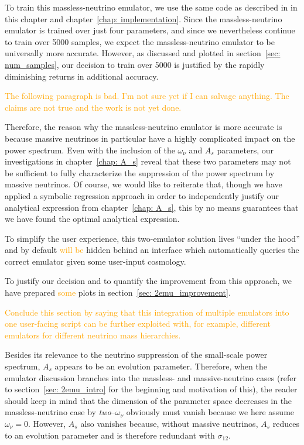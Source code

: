 To train this massless-neutrino emulator, we use the same code as described in 
in this chapter and chapter~\ref{chap: implementation}. Since the
massless-neutrino emulator is trained over just four parameters, and since we 
nevertheless continue to train over 5000 samples, we expect the
massless-neutrino emulator to be universally more accurate. However, as
discussed and plotted in section~\ref{sec: num_samples}, our decision to train 
over 5000 is justified by the rapidly diminishing returns in additional 
accuracy.

\textcolor{orange}{The following paragraph is bad. I'm not sure yet if I can
salvage anything. The claims are not true and the work is not yet done.}

Therefore, the reason why the massless-neutrino emulator is more 
accurate is because massive neutrinos in particular have a highly complicated 
impact on the power spectrum. Even with the inclusion of the $\omega_\nu$ and 
$A_s$ parameters, our investigations in chapter~\ref{chap: A_s} reveal that
these two parameters may not be sufficient to fully characterize the 
suppression of the power spectrum by massive neutrinos. Of course, we would 
like to reiterate that, though we have applied a symbolic regression approach 
in order to independently justify our analytical expression from
chapter~\ref{chap: A_s}, this by no means guarantees that we have found the 
optimal analytical expression.

To simplify the user experience, this two-emulator solution lives ``under the
hood'' and by default \textcolor{orange}{will be} hidden behind an interface
which automatically queries the correct emulator given some user-input
cosmology.

To justify our decision and to quantify the improvement from this approach, we
have prepared \textcolor{orange}{some} plots in
section~\ref{sec: 2emu_improvement}.

\textcolor{orange}{Conclude this section by saying that this integration of 
multiple emulators into one user-facing script can be further exploited with, 
for example, different emulators for different neutrino mass hierarchies.}

Besides its relevance to the neutrino suppression of the small-scale power
spectrum, $A_s$ appears to be an evolution parameter. Therefore, when the
emulator discussion branches into the massless- and massive-neutrino cases
(refer to section~\ref{sec: 2emu_intro} for the beginning and motivation of
this), the reader should keep in mind that the dimension of the parameter
space decreases in the massless-neutrino case by \textit{two}--$\omega_\nu$ 
obviously must vanish because we here assume $\omega_\nu=0$. However, $A_s$
also vanishes because, without massive neutrinos, $A_s$ reduces to an
evolution parameter and is therefore redundant with $\sigma_{12}$.

